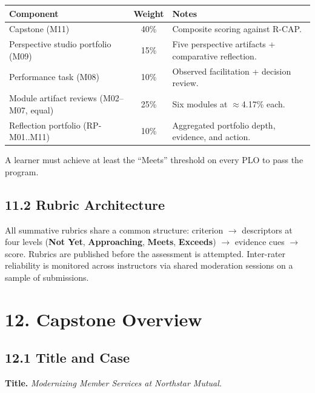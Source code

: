 \documentclass[11pt,letterpaper,oneside]{report}
\begin{document}
\begin{tcolorbox}[callout,colback=afpaper,colframe=afnavy,colbacktitle=afnavy,title=Summative Assessment Weighting]
\begin{tabularx}{\linewidth}{@{}R{8.0cm} c >{\raggedright\arraybackslash}X@{}}
\toprule
\sffamily\bfseries Component & \sffamily\bfseries Weight & \sffamily\bfseries Notes \\
\midrule
Capstone (M11)                                           & 40\% & Composite scoring against R-CAP. \\
Perspective studio portfolio (M09)                       & 15\% & Five perspective artifacts + comparative reflection. \\
Performance task (M08)                                   & 10\% & Observed facilitation + decision review. \\
Module artifact reviews (M02--M07, equal)                & 25\% & Six modules at $\approx$4.17\% each. \\
Reflection portfolio (RP-M01..M11)                       & 10\% & Aggregated portfolio depth, evidence, and action. \\
\bottomrule
\end{tabularx}
\end{tcolorbox}

A learner must achieve at least the ``Meets'' threshold on every PLO to pass the program.

\subsection*{11.2 Rubric Architecture}
All summative rubrics share a common structure: criterion $\to$ descriptors at four levels (\textbf{Not Yet}, \textbf{Approaching}, \textbf{Meets}, \textbf{Exceeds}) $\to$ evidence cues $\to$ score. Rubrics are published before the assessment is attempted. Inter-rater reliability is monitored across instructors via shared moderation sessions on a sample of submissions.


\section*{12. Capstone Overview}

\subsection*{12.1 Title and Case}
\textbf{Title.} \emph{Modernizing Member Services at Northstar Mutual.}
\end{document}
